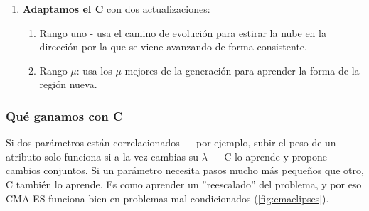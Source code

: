 \begin{enumerate}
    \item \textbf{Adaptamos el C} con dos actualizaciones: 
    \begin{enumerate}
        \item Rango uno - usa el camino de evolución para estirar la nube en la dirección por la que se viene avanzando de forma consistente. 
        \item Rango $\mu$: usa los $\mu$ mejores de la generación para aprender la forma de la región nueva.
    \end{enumerate}
\end{enumerate}

\subsubsection{Qué ganamos con C}

Si dos parámetros están correlacionados --- por ejemplo, subir el peso de un atributo solo funciona si a la vez cambias su $\lambda$ --- C lo aprende y propone cambios conjuntos. Si un parámetro necesita pasos mucho más pequeños que otro, C también lo aprende. Es como aprender un ''reescalado'' del problema, y por eso CMA-ES funciona bien en problemas mal condicionados (\autoref{fig:cmaelipses}).

